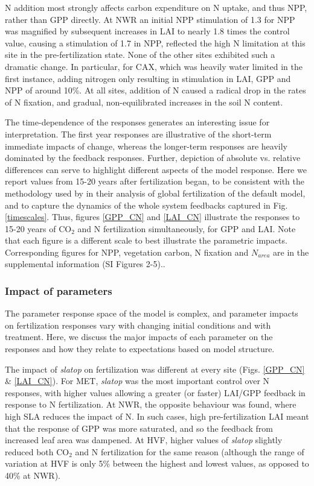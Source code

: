 \documentclass[draft,linenumbers]{agujournal}
\begin{document}
 
N addition most strongly affects carbon expenditure on N uptake, and thus NPP, rather than GPP directly. At NWR an initial NPP stimulation of 1.3 for NPP was magnified by subsequent increases in LAI to nearly 1.8 times the control value, causing a stimulation of 1.7 in NPP, reflected the high N limitation at this site in the pre-fertilization state. None of the other sites exhibited such a dramatic change. In particular, for CAX, which was heavily water limited in the first instance, adding nitrogen only resulting in stimulation in LAI, GPP and NPP of around 10\%. At all sites, addition of N caused a radical drop in the rates of N fixation, and gradual, non-equilibrated increases in the soil N content. 

The time-dependence of the responses generates an interesting issue for interpretation. The first year responses are illustrative of the short-term immediate impacts of change, whereas the longer-term responses are heavily dominated by the feedback responses. Further, depiction of absolute vs. relative differences can serve to highlight different aspects of the model response. Here we report values from 15-20 years after fertilization began, to be consistent with the methodology used by \cite{wieder2019} in their analysis of global fertilization of the default model, and to capture the dynamics of the whole system feedbacks captured in Fig. \ref{timescales}.  Thus, figures \ref{GPP_CN} and \ref{LAI_CN} illustrate the responses to 15-20 years of CO$_{2}$ and N  fertilization simultaneously, for GPP and LAI.  Note that each figure is a different scale to best illustrate the parametric impacts.  Corresponding figures for NPP, vegetation carbon, N fixation and $N_{area}$ are in the supplemental information (SI Figures 2-5)..  

\subsubsection{Impact of parameters}
The parameter response space of the model is complex, and parameter impacts on fertilization responses vary with changing initial conditions and with treatment. Here, we discuss the major impacts of each parameter on the responses and how they relate to expectations based on model structure. 

The impact of \emph{slatop} on fertilization was different at every site (Figs. \ref{GPP_CN} \&  \ref{LAI_CN}). For MET, \emph{slatop} was the most important control over N responses, with higher values allowing a greater (or faster) LAI/GPP feedback in response to N fertilization. At NWR, the opposite behaviour was found, where high SLA reduces the impact of N. In such cases, high pre-fertilization LAI meant that the response of GPP was more saturated, and so the feedback from increased leaf area was dampened. At HVF, higher values of \emph{slatop} slightly reduced both CO$_{2}$ and N fertilization for the same reason (although the range of variation at HVF is only 5\% between the highest and lowest values, as opposed to 40\% at NWR).
\end{document}
